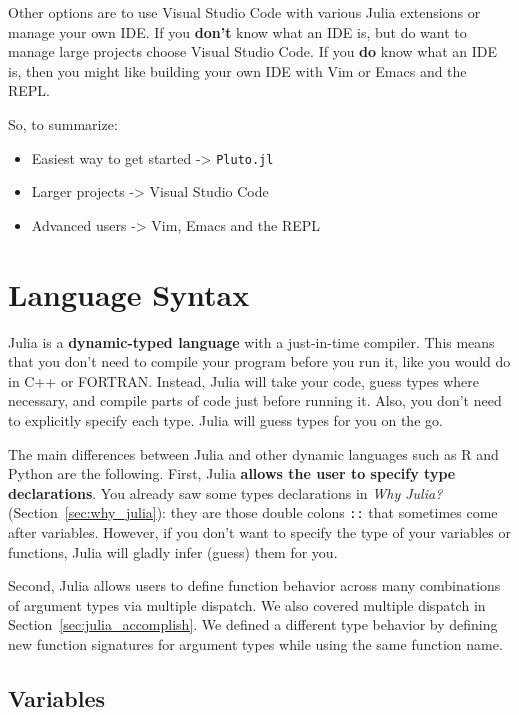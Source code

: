 \documentclass[
  notoc %
]{tufte-book}
\providecommand{\tightlist}{%
  \setlength{\itemsep}{0pt}\setlength{\parskip}{0pt}
}
\newcommand{\passthrough}[1]{#1}
\begin{document}
Other options are to use Visual Studio Code with various Julia
extensions or manage your own IDE. If you \textbf{don't} know what an
IDE is, but do want to manage large projects choose Visual Studio Code.
If you \textbf{do} know what an IDE is, then you might like building
your own IDE with Vim or Emacs and the REPL.

So, to summarize:

\begin{itemize}
\tightlist
\item
  Easiest way to get started -\textgreater{}
  \passthrough{\lstinline!Pluto.jl!}
\item
  Larger projects -\textgreater{} Visual Studio Code
\item
  Advanced users -\textgreater{} Vim, Emacs and the REPL
\end{itemize}

\hypertarget{sec:syntax}{%
\section{Language Syntax}\label{sec:syntax}}

Julia is a \textbf{dynamic-typed language} with a just-in-time compiler.
This means that you don't need to compile your program before you run
it, like you would do in C++ or FORTRAN. Instead, Julia will take your
code, guess types where necessary, and compile parts of code just before
running it. Also, you don't need to explicitly specify each type. Julia
will guess types for you on the go.

The main differences between Julia and other dynamic languages such as R
and Python are the following. First, Julia \textbf{allows the user to
specify type declarations}. You already saw some types declarations in
\emph{Why Julia?} (Section~\ref{sec:why_julia}): they are those double
colons \passthrough{\lstinline!::!} that sometimes come after variables.
However, if you don't want to specify the type of your variables or
functions, Julia will gladly infer (guess) them for you.

Second, Julia allows users to define function behavior across many
combinations of argument types via multiple dispatch. We also covered
multiple dispatch in Section~\ref{sec:julia_accomplish}. We defined a
different type behavior by defining new function signatures for argument
types while using the same function name.

\hypertarget{sec:variable}{%
\subsection{Variables}\label{sec:variable}}
\end{document}
